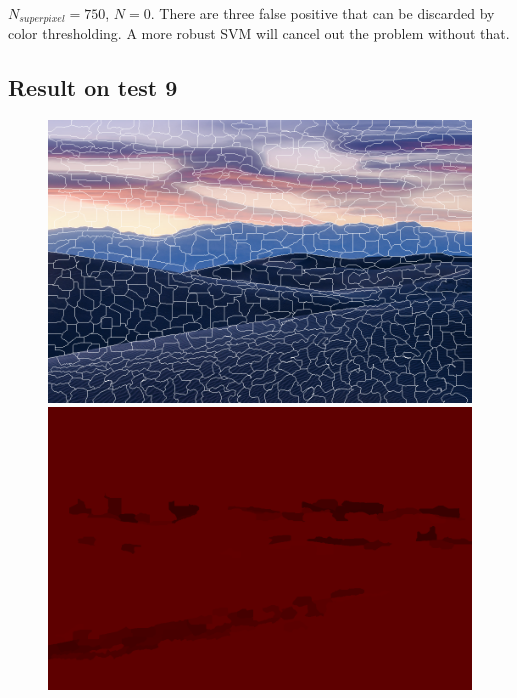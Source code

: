 \documentclass[a4paper,titlepaget]{article}
\begin{document}
$N_{superpixel}=750$, $N=0$. There are three false positive that can be discarded by color thresholding. A more robust SVM will cancel out the problem without that.
\newpage

\subsection{Result on test 9}
\begin{figure}[htpb] 
	\centering
	\begin{minipage}{.3\textwidth}
		\includegraphics[width=1.7\textwidth]{images/results/9seg} 
	\end{minipage}
	\hspace{.25\textwidth}
	\begin{minipage}{.3\textwidth}
		\includegraphics[width=1.7\textwidth]{images/results/9map}
	\end{minipage}  
\end{figure}
\end{document}
